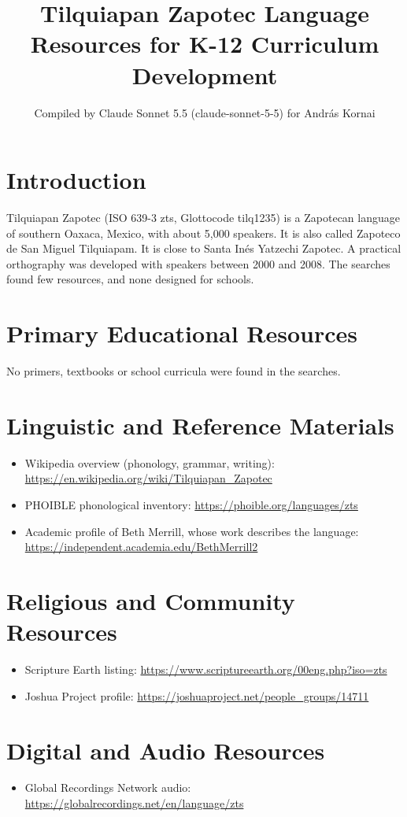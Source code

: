 \documentclass[12pt]{article}
\title{Tilquiapan Zapotec Language Resources for K-12 Curriculum Development}
\author{Compiled by Claude Sonnet 5.5 (claude-sonnet-5-5) for Andr\'as Kornai}
\date{}
\begin{document}
\maketitle

\section{Introduction}
Tilquiapan Zapotec (ISO 639-3 zts, Glottocode tilq1235) is a Zapotecan language of southern Oaxaca, Mexico, with about 5,000 speakers. It is also called Zapoteco de San Miguel Tilquiapam. It is close to Santa In\'es Yatzechi Zapotec. A practical orthography was developed with speakers between 2000 and 2008. The searches found few resources, and none designed for schools.

\section{Primary Educational Resources}
No primers, textbooks or school curricula were found in the searches.

\section{Linguistic and Reference Materials}
\begin{itemize}
\item Wikipedia overview (phonology, grammar, writing): \url{https://en.wikipedia.org/wiki/Tilquiapan_Zapotec}
\item PHOIBLE phonological inventory: \url{https://phoible.org/languages/zts}
\item Academic profile of Beth Merrill, whose work describes the language: \url{https://independent.academia.edu/BethMerrill2}
\end{itemize}

\section{Religious and Community Resources}
\begin{itemize}
\item Scripture Earth listing: \url{https://www.scriptureearth.org/00eng.php?iso=zts}
\item Joshua Project profile: \url{https://joshuaproject.net/people_groups/14711}
\end{itemize}

\section{Digital and Audio Resources}
\begin{itemize}
\item Global Recordings Network audio: \url{https://globalrecordings.net/en/language/zts}
\end{itemize}
\end{document}
